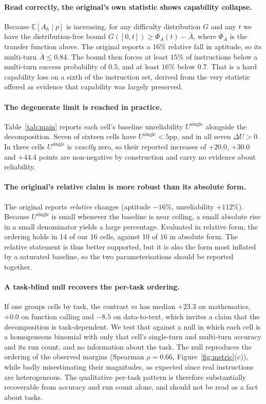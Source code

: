\documentclass{article}
\begin{document}
\paragraph{Read correctly, the original's own statistic shows capability collapse.} Because $\mathbb{E}[A_h \mid p]$ is increasing, for any difficulty distribution $G$ and any $t$ we have the distribution-free bound $G([0,t]) \ge \Phi_A(t) - \bar{A}$, where $\Phi_A$ is the transfer function above. The original reports a $16\%$ relative fall in aptitude, so its multi-turn $\bar{A} \le 0.84$. The bound then forces at least $15\%$ of instructions below a multi-turn success probability of $0.5$, and at least $16\%$ below $0.7$. That is a hard capability loss on a sixth of the instruction set, derived from the very statistic offered as evidence that capability was largely preserved.

\paragraph{The degenerate limit is reached in practice.} Table~\ref{tab:main} reports each cell's baseline unreliability
$U^{\text{single}}$ alongside the decomposition. Seven of sixteen cells have
$U^{\text{single}} < 5$pp, and in all seven $\Delta U > 0$. In three cells $U^{\text{single}}$ is
\emph{exactly} zero, so their reported increases of $+20.0$, $+30.0$ and $+44.4$ points are
non-negative by construction and carry no evidence about reliability.

\paragraph{The original's relative claim is more robust than its absolute form.} The original
reports \emph{relative} changes (aptitude $-16\%$, unreliability $+112\%$). Because
$U^{\text{single}}$ is small whenever the baseline is near ceiling, a small absolute rise in a
small denominator yields a large percentage. Evaluated in relative form, the ordering holds in
14 of our 16 cells, against 10 of 16 in absolute form. The relative statement is thus better
supported, but it is also the form most inflated by a saturated baseline, so the two
parameterisations should be reported together.

\paragraph{A task-blind null recovers the per-task ordering.} If one groups cells by task, the
contrast $m$ has median $+23.3$ on mathematics, $+0.0$ on function calling and $-8.5$ on
data-to-text, which invites a claim that the decomposition is task-dependent. We test that against
a null in which each cell is a homogeneous binomial with only that cell's single-turn and
multi-turn accuracy and its run count, and no information about the task. The null reproduces the
ordering of the observed margins (Spearman $\rho = 0.66$, Figure~\ref{fig:metric}(c)), while badly
misestimating their magnitudes, as expected since real instructions are heterogeneous. The
qualitative per-task pattern is therefore substantially recoverable from accuracy and run count
alone, and should not be read as a fact about tasks.
\end{document}

